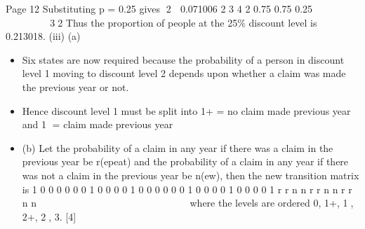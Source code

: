 \documentclass[a4paper,12pt]{article}
\begin{document}
Page 12
Substituting p = 0.25 gives 2  0.071006
2
3 4 2
0.75 0.75
0.25
        
 
 32
Thus the proportion of people at the 25\% discount level is 0.213018. 
(iii) (a) 
\begin{itemize}
\item Six states are now required
because the probability of a person in discount level 1 moving to
discount level 2 depends upon whether a claim was made the previous
year or not.
\item Hence discount level 1 must be split into
1+ = no claim made previous year and
1 = claim made previous year
\item (b) Let the probability of a claim in any year if there was a claim in the
previous year be r(epeat) and the probability of a claim in any year if
there was not a claim in the previous year be n(ew), then the new
transition matrix is
1 0 0 0 0
0 0 1 0 0
0 0 1 0 0
0 0 0 0 1
0 0 0 0 1
0 0 0 0 1
r r
n n
r r
n n
r r
n n
  
    
  
 
  
  
    
where the levels are ordered 0, 1+, 1, 2+, 2, 3. [4]
\end{itemize}
\end{document}
